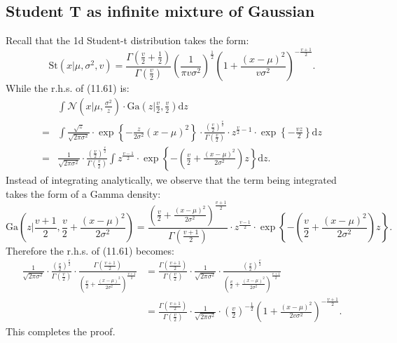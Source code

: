 \documentclass[UTF8]{ctexart}
\begin{document}
\subsection{Student T as infinite mixture of Gaussian}
Recall that the 1d Student-t distribution takes the form:
$$\text{St}(x|\mu,\sigma^{2},v)=\frac{\Gamma(\frac{v}{2}+\frac{1}{2})}{\Gamma(\frac{v}{2})}\left(\frac{1}{\pi v \sigma^{2}}\right)^{\frac{1}{2}}\left(1+\frac{(x-\mu)^{2}}{v\sigma^{2}}\right)^{-\frac{v+1}{2}}.$$
While the r.h.s. of (11.61) is:
\begin{align}
 & \int \mathcal{N}(x|\mu,\frac{\sigma^{2}}{z})\cdot\text{Ga}\left(z|\frac{v}{2},\frac{v}{2}\right)\text{d}z \nonumber \\
=&\int \frac{\sqrt{z}}{\sqrt{2\pi\sigma^{2}}}\cdot\exp\left\{ -\frac{z}{2\sigma^{2}}(x-\mu)^{2} \right\}\cdot\frac{(\frac{v}{2})^{\frac{v}{2}}}{\Gamma(\frac{v}{2})}\cdot z^{\frac{v}{2}-1}\cdot\exp\left\{ -\frac{vz}{2} \right\}\text{d}z \nonumber \\
=&\frac{1}{\sqrt{2\pi \sigma^{2}}}\cdot\frac{(\frac{v}{2})^{\frac{v}{2}}}{\Gamma(\frac{v}{2})}\int z^{\frac{v-1}{2}}\cdot\exp\left\{ -\left(\frac{v}{2}+\frac{(x-\mu)^{2}}{2\sigma^{2}}\right)z \right\} \text{d}z. \nonumber
\end{align}
Instead of integrating analytically, we observe that the term being integrated takes the form of a Gamma density:
$$\text{Ga}\left(z|\frac{v+1}{2},\frac{v}{2}+\frac{(x-\mu)^{2}}{2\sigma^{2}}\right)=\frac{\left(\frac{v}{2}+\frac{(x-\mu)^{2}}{2\sigma^{2}} \right)^{\frac{v+1}{2}}}{\Gamma\left(\frac{v+1}{2}\right)}\cdot z^{\frac{v-1}{2}}\cdot\exp\left\{ -\left(\frac{v}{2}+\frac{(x-\mu)^{2}}{2\sigma^{2}}\right)z \right\}.$$
Therefore the r.h.s. of (11.61) becomes:
$$
\begin{aligned}
\frac{1}{\sqrt{2\pi \sigma^{2}}}\cdot\frac{(\frac{v}{2})^{\frac{v}{2}}}{\Gamma(\frac{v}{2})} \cdot \frac{\Gamma\left(\frac{v+1}{2}\right)}{\left(\frac{v}{2}+\frac{(x-\mu)^{2}}{2\sigma^{2}} \right)^{\frac{v+1}{2}}}&=\frac{\Gamma(\frac{v+1}{2})}{\Gamma(\frac{v}{2})}\cdot \frac{1}{\sqrt{2\pi\sigma^{2}}}\cdot\frac{(\frac{v}{2})^{\frac{v}{2}}}{\left(\frac{v}{2}+\frac{(x-\mu)^{2}}{2\sigma^{2}}\right)^{\frac{v+1}{2}}}\\
&=\frac{\Gamma(\frac{v+1}{2})}{\Gamma(\frac{v}{2})}\cdot \frac{1}{\sqrt{2\pi\sigma^{2}}}\cdot (\frac{v}{2})^{-\frac{1}{2}}\left(1+\frac{(x-\mu)^{2}}{2v\sigma^{2}} \right)^{-\frac{v+1}{2}}.
\end{aligned}
$$
This completes the proof.
\end{document}
